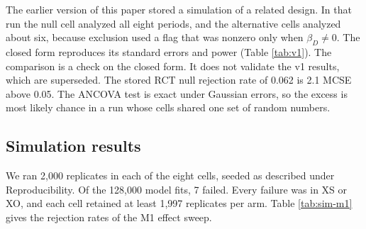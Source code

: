 \documentclass[
  11pt,
]{article}
\begin{document}
The earlier version of this paper stored a simulation of a related design. In that run the null cell analyzed all eight periods, and the alternative cells analyzed about six, because exclusion used a flag that was nonzero only when \(\beta_D \ne 0\). The closed form reproduces its standard errors and power (Table \ref{tab:v1}). The comparison is a check on the closed form. It does not validate the v1 results, which are superseded. The stored RCT null rejection rate of 0.062 is 2.1 MCSE above 0.05. The ANCOVA test is exact under Gaussian errors, so the excess is most likely chance in a run whose cells shared one set of random numbers.

\begin{table}[!h]
\centering
\caption{\label{tab:v1}Closed form against the stored 2026-05-19 run (2,000 replicates per cell, one shared random-number stream).}
\centering
{}
\end{table}

\subsection{Simulation results}\label{simulation-results}

We ran 2,000 replicates in each of the eight cells, seeded as described under Reproducibility. Of the 128,000 model fits, 7 failed. Every failure was in XS or XO, and each cell retained at least 1,997 replicates per arm. Table \ref{tab:sim-m1} gives the rejection rates of the M1 effect sweep.
\end{document}
